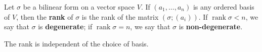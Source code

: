 Let $\sigma$ be a bilinear form on a vector space $V$. If $(a_1, \ldots, a_n)$ is any ordered basis of $V$, then the \textbf{rank} of $\sigma$ is the rank of the matrix $(\sigma; (a_i))$. If $\operatorname{rank} \sigma < n$, we say that $\sigma$ is \textbf{degenerate}; if $\operatorname{rank} \sigma = n$, we say that $\sigma$ is \textbf{non-degenerate}.

The rank is independent of the choice of basis.

